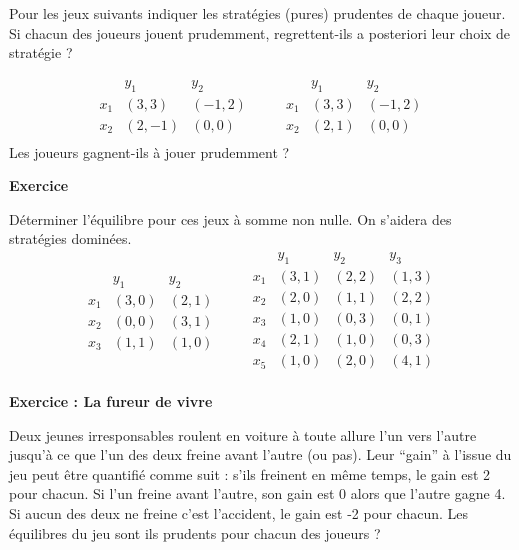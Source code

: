 \documentclass[12pt]{article}
\begin{document}
    Pour les jeux suivants indiquer les strat\'egies (pures) prudentes de chaque joueur. Si chacun des joueurs
jouent prudemment, regrettent-ils a posteriori leur choix de strat\'egie ?

\[
\begin{array}{l|rr}
    & y_1 & y_2  \\ \hline
x_1 & (3,3) & (-1,2)\\
x_2 & (2,-1)&(0,0)\\
\end{array} \qquad
\begin{array}{l|rr}
    & y_1 & y_2  \\ \hline
x_1 & (3,3) & (-1,2)\\
x_2 & (2,1)&(0,0)\\
\end{array}
\]
Les joueurs gagnent-ils \`a jouer prudemment ?


\newpage


\begin{center}
\textbf{Exercice}
\end{center}

D\'eterminer l'\'equilibre pour ces jeux \`a somme non nulle. On s'aidera des strat\'egies domin\'ees.
\[
\begin{array}{l|rr}
    & y_1 & y_2  \\ \hline
x_1 & (3,0) & (2,1)\\
x_2 & (0,0)&(3,1)\\
x_3 & (1,1)&(1,0)
\end{array} \qquad
\begin{array}{l|rrr}
    & y_1 & y_2 & y_3 \\ \hline
x_1 & (3,1) & (2,2) & (1,3) \\
x_2 & (2,0)&(1,1)&(2,2)\\
x_3 & (1,0)&(0,3)&(0,1)\\
x_4 & (2,1)&(1,0)&(0,3)\\
x_5 & (1,0)&(2,0)&(4,1)\\
\end{array}
\]

\begin{center}
\textbf{Exercice : La fureur de vivre}
\end{center}

                        
Deux jeunes irresponsables roulent en voiture \`a toute allure l’un vers l’autre jusqu'\`a ce que l’un des deux freine
avant l’autre (ou pas). Leur ``gain'' \`a l'issue du jeu peut \^etre quantifi\'e comme suit : s'ils freinent en m\^eme
temps, le gain est 2 pour chacun. Si l'un freine avant l'autre, son gain est 0 alors que l’autre gagne 4. Si aucun
des deux ne freine c’est l’accident, le gain est -2 pour chacun.
Les  \'equilibres du jeu sont ils prudents pour chacun des joueurs ?
\end{document}
